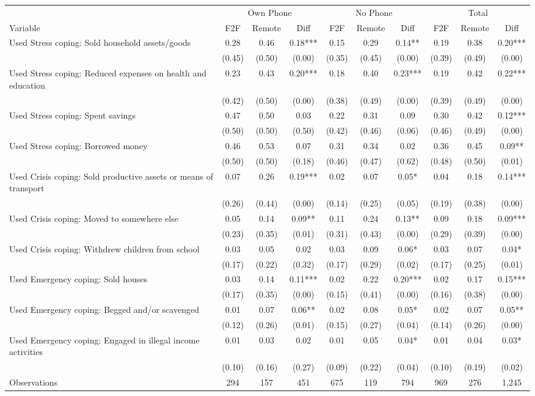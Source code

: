 \begin{tabular}{l*{9}c}
\hline\hline
 & \multicolumn{3}{c}{Own Phone} & \multicolumn{3}{c}{No Phone} & \multicolumn{3}{c}{Total}\\ 
Variable & F2F & Remote & Diff & F2F & Remote & Diff & F2F & Remote & Diff \\
\hline
Used Stress coping: Sold household assets/goods&0.28&0.46&0.18***&0.15&0.29&0.14**&0.19&0.38&0.20***\\
&(0.45)&(0.50)&(0.00)&(0.35)&(0.45)&(0.00)&(0.39)&(0.49)&(0.00)\\
Used Stress coping: Reduced expenses on health and education&0.23&0.43&0.20***&0.18&0.40&0.23***&0.19&0.42&0.22***\\
&(0.42)&(0.50)&(0.00)&(0.38)&(0.49)&(0.00)&(0.39)&(0.49)&(0.00)\\
Used Stress coping: Spent savings&0.47&0.50&0.03&0.22&0.31&0.09&0.30&0.42&0.12***\\
&(0.50)&(0.50)&(0.50)&(0.42)&(0.46)&(0.06)&(0.46)&(0.49)&(0.00)\\
Used Stress coping: Borrowed money&0.46&0.53&0.07&0.31&0.34&0.02&0.36&0.45&0.09**\\
&(0.50)&(0.50)&(0.18)&(0.46)&(0.47)&(0.62)&(0.48)&(0.50)&(0.01)\\
Used Crisis coping: Sold productive assets or means of transport&0.07&0.26&0.19***&0.02&0.07&0.05*&0.04&0.18&0.14***\\
&(0.26)&(0.44)&(0.00)&(0.14)&(0.25)&(0.05)&(0.19)&(0.38)&(0.00)\\
Used Crisis coping: Moved to somewhere else&0.05&0.14&0.09**&0.11&0.24&0.13**&0.09&0.18&0.09***\\
&(0.23)&(0.35)&(0.01)&(0.31)&(0.43)&(0.00)&(0.29)&(0.39)&(0.00)\\
Used Crisis coping: Withdrew children from school&0.03&0.05&0.02&0.03&0.09&0.06*&0.03&0.07&0.04*\\
&(0.17)&(0.22)&(0.32)&(0.17)&(0.29)&(0.02)&(0.17)&(0.25)&(0.01)\\
Used Emergency coping: Sold houses&0.03&0.14&0.11***&0.02&0.22&0.20***&0.02&0.17&0.15***\\
&(0.17)&(0.35)&(0.00)&(0.15)&(0.41)&(0.00)&(0.16)&(0.38)&(0.00)\\
Used Emergency coping: Begged and/or scavenged&0.01&0.07&0.06**&0.02&0.08&0.05*&0.02&0.07&0.05**\\
&(0.12)&(0.26)&(0.01)&(0.15)&(0.27)&(0.04)&(0.14)&(0.26)&(0.00)\\
Used Emergency coping: Engaged in illegal income activities&0.01&0.03&0.02&0.01&0.05&0.04*&0.01&0.04&0.03*\\
&(0.10)&(0.16)&(0.27)&(0.09)&(0.22)&(0.04)&(0.10)&(0.19)&(0.02)\\
\hline
Observations & 294 & 157 & 451 & 675 & 119 & 794 & 969 & 276 & 1,245 \\
\hline\hline
\end{tabular}
